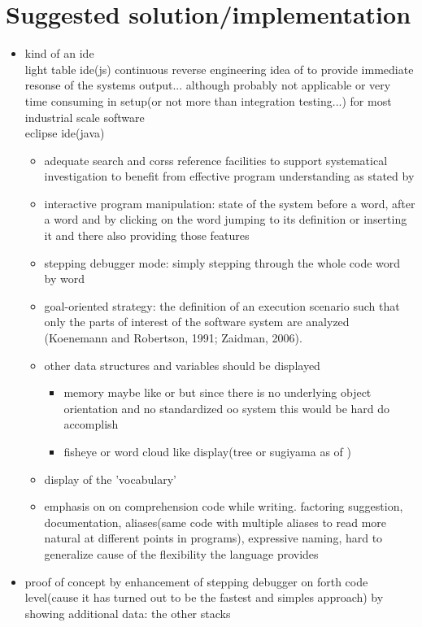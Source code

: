 \chapter{Suggested solution/implementation}

\begin{itemize}
\item kind of an ide \\
light table ide(js) continuous reverse engineering idea of \cite{Muller:2000:RER:336512.336526} to provide immediate resonse of the systems output... although probably not applicable or very time consuming in setup(or not more than integration testing...) for most industrial scale software
\\eclipse ide(java)
	\begin{itemize}
	\item adequate search and corss reference facilities to support systematical investigation to benefit from effective program understanding as stated by \cite{Robillard:2004:EDI:1042203.1042417}
	\item interactive program manipulation: state of the system before a word, after a word and by clicking on the word jumping to its definition or inserting it and there also providing those features
	\item stepping debugger mode: simply stepping through the whole code word by word
	\item goal-oriented strategy: the definition of an execution scenario such that only the parts of interest of the software system are analyzed (Koenemann and Robertson, 1991; Zaidman,
	2006).
	\item other data structures and variables should be displayed
		\begin{itemize}
		\item memory maybe like \cite{ReissProgrammingEnvironments1995} or \cite{Aftandilian:2010:HIH:1879211.1879222} but since there is no underlying object orientation and no standardized oo system this would be hard do accomplish
		\item fisheye or word cloud like display(tree or sugiyama as of \cite{Storey:1997:IVT:857188.857642})
		\end{itemize}
	\item display of the 'vocabulary'
	\item emphasis on on comprehension code while writing. factoring suggestion, documentation, aliases(same code with multiple aliases to read more natural at different points in programs),  expressive naming, hard to generalize cause of the flexibility the language provides
	\end{itemize}
\item proof of concept by enhancement of stepping debugger on forth code level(cause it has turned out to be the fastest and simples approach) by showing additional data: the other stacks
\end{itemize}
